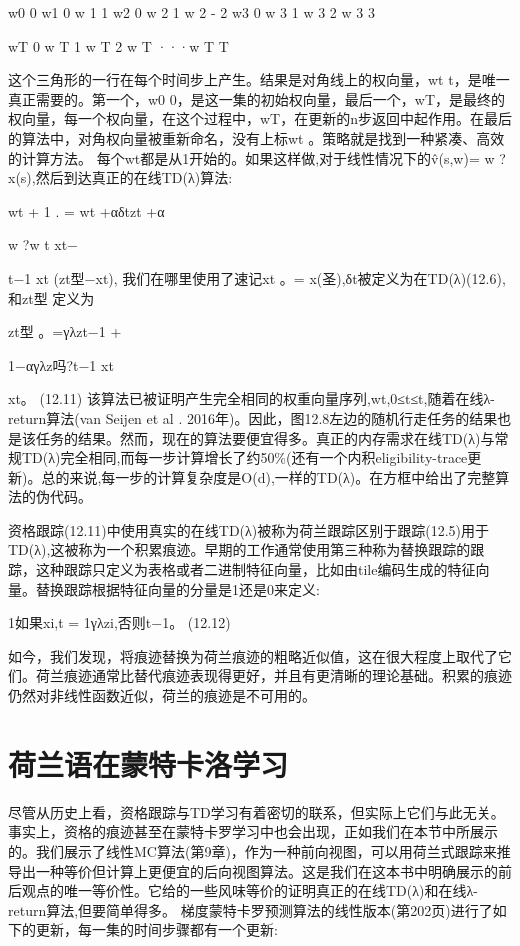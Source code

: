 w0 0
w1 0 w
1 1
w2 0 w
2
1 w
2 - 2
w3 0 w
3
1 w
3
2 w
3 3

wT 0 w
T
1 w
T
2 w
T
···w
T T

这个三角形的一行在每个时间步上产生。结果是对角线上的权向量，wt t，是唯一真正需要的。第一个，w0 0，是这一集的初始权向量，最后一个，wT，是最终的权向量，每一个权向量，在这个过程中，wT，在更新的n步返回中起作用。在最后的算法中，对角权向量被重新命名，没有上标wt
。策略就是找到一种紧凑、高效的计算方法。
每个wt都是从1开始的。如果这样做,对于线性情况下的v̂(s,w)= w ? x(s),然后到达真正的在线TD(λ)算法:

wt + 1
.
= wt +αδtzt +α

w ?w t xt−

t−1 xt
(zt型−xt),
我们在哪里使用了速记xt
。= x(圣),δt被定义为在TD(λ)(12.6),和zt型
定义为

zt型
。=γλzt−1 +

1−αγλz吗?t−1 xt

xt。 					(12.11)
该算法已被证明产生完全相同的权重向量序列,wt,0≤t≤t,随着在线λ-return算法(van Seijen et al . 2016年)。因此，图12.8左边的随机行走任务的结果也是该任务的结果。然而，现在的算法要便宜得多。真正的内存需求在线TD(λ)与常规TD(λ)完全相同,而每一步计算增长了约50\%(还有一个内积eligibility-trace更新)。总的来说,每一步的计算复杂度是O(d),一样的TD(λ)。在方框中给出了完整算法的伪代码。


资格跟踪(12.11)中使用真实的在线TD(λ)被称为荷兰跟踪区别于跟踪(12.5)用于TD(λ),这被称为一个积累痕迹。早期的工作通常使用第三种称为替换跟踪的跟踪，这种跟踪只定义为表格或者二进制特征向量，比如由tile编码生成的特征向量。替换跟踪根据特征向量的分量是1还是0来定义:

1如果xi,t = 1γλzi,否则t−1。
(12.12)


如今，我们发现，将痕迹替换为荷兰痕迹的粗略近似值，这在很大程度上取代了它们。荷兰痕迹通常比替代痕迹表现得更好，并且有更清晰的理论基础。积累的痕迹仍然对非线性函数近似，荷兰的痕迹是不可用的。

\section{荷兰语在蒙特卡洛学习}

尽管从历史上看，资格跟踪与TD学习有着密切的联系，但实际上它们与此无关。事实上，资格的痕迹甚至在蒙特卡罗学习中也会出现，正如我们在本节中所展示的。我们展示了线性MC算法(第9章)，作为一种前向视图，可以用荷兰式跟踪来推导出一种等价但计算上更便宜的后向视图算法。这是我们在这本书中明确展示的前后观点的唯一等价性。它给的一些风味等价的证明真正的在线TD(λ)和在线λ-return算法,但要简单得多。
梯度蒙特卡罗预测算法的线性版本(第202页)进行了如下的更新，每一集的时间步骤都有一个更新:


